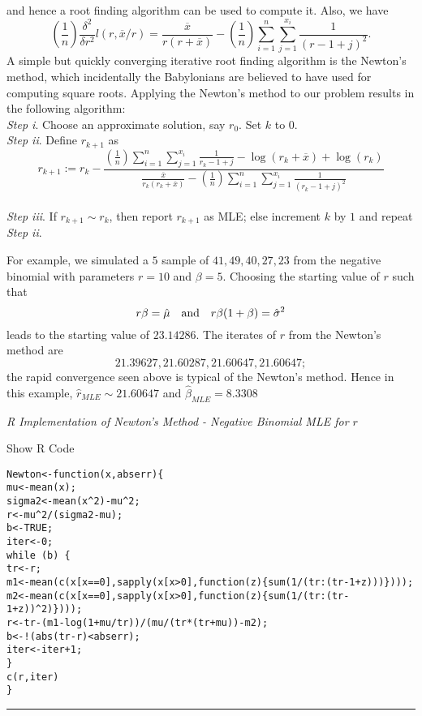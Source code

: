 \documentclass[]{book}
\theoremstyle{definition}
\theoremstyle{definition}
\theoremstyle{definition}
\theoremstyle{remark}
\begin{document}
and hence a root finding algorithm can be used to compute it. Also, we
have \[
\left(\frac{1}{n}\right)\frac{\delta^2}{\delta r^2}l(r,\overline{x}/r)=\frac{\overline{x}}{r(r+\overline{x})}-\left(\frac{1}{n}\right)\sum_{i=1}^n \sum_{j=1}^{x_i}\frac{1}{(r-1+j)^2}.
\] A simple but quickly converging iterative root finding algorithm is
the Newton's method, which incidentally the Babylonians are believed to
have used for computing square roots. Applying the Newton's method to
our problem results in the following algorithm:\\
 \emph{Step i}. Choose an approximate solution, say \(r_0\). Set \(k\)
to \(0\).\\
\emph{Step ii}. Define \(r_{k+1}\) as \[
r_{k+1}:= r_k - \frac{\left(\frac{1}{n}\right)\sum_{i=1}^n \sum_{j=1}^{x_i}\frac{1}{r_k-1+j} - \log(r_k+\overline{x}) + \log(r_k)}{\frac{\overline{x}}{r_k(r_k+\overline{x})}-\left(\frac{1}{n}\right)\sum_{i=1}^n \sum_{j=1}^{x_i}\frac{1}{(r_k-1+j)^2}}
\]\\
\emph{Step iii}. If \(r_{k+1}\sim r_k\), then report \(r_{k+1}\) as MLE;
else increment \(k\) by \(1\) and repeat \emph{Step ii}.

For example, we simulated a \(5\) sample of \(41, 49, 40, 27, 23\) from
the negative binomial with parameters \(r=10\) and \(\beta=5\). Choosing
the starting value of \(r\) such that \[
r\beta=\hat{\mu} \quad \hbox{and} \quad r\beta(1+\beta)=\hat{\sigma}^2
\] leads to the starting value of \(23.14286\). The iterates of \(r\)
from the Newton's method are \[
21.39627, 21.60287, 21.60647, 21.60647;
\] the rapid convergence seen above is typical of the Newton's method.
Hence in this example, \(\hat{r}_{MLE}\sim21.60647\) and
\(\hat{\beta}_{MLE}=8.3308\)

\emph{R Implementation of Newton's Method - Negative Binomial MLE for
\(r\)}

Show R Code

\hypertarget{toggleCodeFreq.1}{}
\begin{verbatim}
Newton<-function(x,abserr){
mu<-mean(x);
sigma2<-mean(x^2)-mu^2;
r<-mu^2/(sigma2-mu);
b<-TRUE;
iter<-0;
while (b) {
tr<-r;
m1<-mean(c(x[x==0],sapply(x[x>0],function(z){sum(1/(tr:(tr-1+z)))})));
m2<-mean(c(x[x==0],sapply(x[x>0],function(z){sum(1/(tr:(tr-1+z))^2)})));
r<-tr-(m1-log(1+mu/tr))/(mu/(tr*(tr+mu))-m2);
b<-!(abs(tr-r)<abserr);
iter<-iter+1;
}
c(r,iter)
}
\end{verbatim}

\begin{center}\rule{0.5\linewidth}{\linethickness}\end{center}
\end{document}
